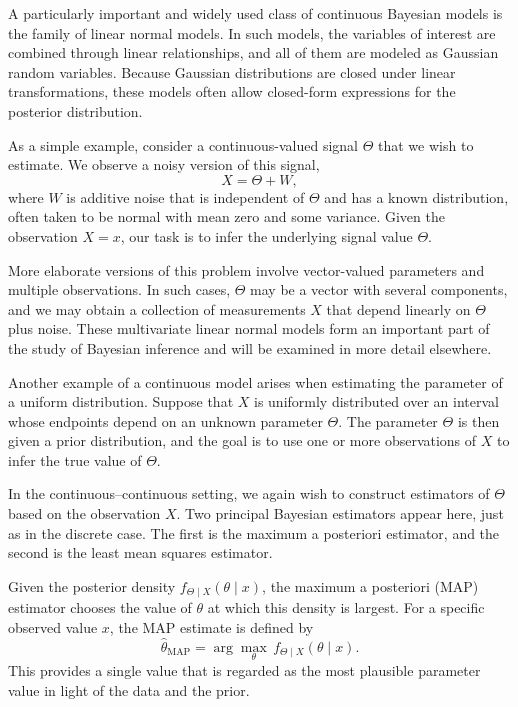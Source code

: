 A particularly important and widely used class of continuous Bayesian models is the family of linear normal models.  
In such models, the variables of interest are combined through linear relationships, and all of them are modeled as Gaussian random variables.  
Because Gaussian distributions are closed under linear transformations, these models often allow closed-form expressions for the posterior distribution.  

As a simple example, consider a continuous-valued signal \(\Theta\) that we wish to estimate.  
We observe a noisy version of this signal,
\[
X = \Theta + W,
\]
where \(W\) is additive noise that is independent of \(\Theta\) and has a known distribution, often taken to be normal with mean zero and some variance.  
Given the observation \(X = x\), our task is to infer the underlying signal value \(\Theta\).  

More elaborate versions of this problem involve vector-valued parameters and multiple observations.  
In such cases, \(\Theta\) may be a vector with several components, and we may obtain a collection of measurements \(X\) that depend linearly on \(\Theta\) plus noise.  
These multivariate linear normal models form an important part of the study of Bayesian inference and will be examined in more detail elsewhere.  

Another example of a continuous model arises when estimating the parameter of a uniform distribution.  
Suppose that \(X\) is uniformly distributed over an interval whose endpoints depend on an unknown parameter \(\Theta\).  
The parameter \(\Theta\) is then given a prior distribution, and the goal is to use one or more observations of \(X\) to infer the true value of \(\Theta\).  

In the continuous–continuous setting, we again wish to construct estimators of \(\Theta\) based on the observation \(X\).  
Two principal Bayesian estimators appear here, just as in the discrete case.  
The first is the maximum a posteriori estimator, and the second is the least mean squares estimator.  

Given the posterior density \(f_{\Theta \mid X}(\theta \mid x)\), the maximum a posteriori (MAP) estimator chooses the value of \(\theta\) at which this density is largest.  
For a specific observed value \(x\), the MAP estimate is defined by
\[
\hat{\theta}_{\text{MAP}}
=
\arg\max_{\theta} \, f_{\Theta \mid X}(\theta \mid x).
\]
This provides a single value that is regarded as the most plausible parameter value in light of the data and the prior.  

